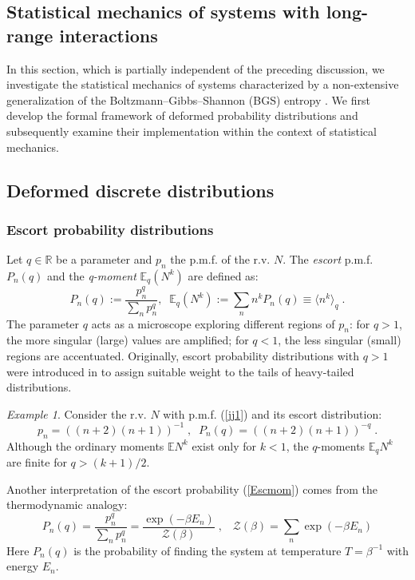 \documentclass[a4paper,12pt]{amsart}
\newcommand{\E}{\mathbb{E}}
\theoremstyle{definition}
\theoremstyle{remark}
\newtheorem{Example}{Example}[section]
\begin{document}
\subsection{Statistical mechanics of systems with long-range interactions }
In this section, which is partially independent of the preceding discussion, we investigate the statistical mechanics of systems characterized by a non-extensive generalization of the Boltzmann–Gibbs–Shannon (BGS) entropy \cite{Tsallis:1987eu}. 
We first develop the formal framework of deformed probability distributions and subsequently examine their implementation within the context of statistical mechanics.
\subsection{Deformed discrete distributions} \label{Escd}
\subsubsection{Escort probability distributions}

Let $q\in \mathbb{R}$ be a parameter and $p_n$ the p.m.f. of the r.v. $N$. The {\it escort} p.m.f. $P_n(q)$ and the {\it q-moment} $\E_q(N^k)$  are defined as:
\begin{equation}\label{Escmom}
  P_n(q):=\frac{p_n^q}{\sum_n p_n^q},\;\; \E_q(N^k):=\sum_n n^k P_n(q)\equiv \langle n^k \rangle _q\;.
\end{equation}
The parameter $q$ acts as a microscope exploring different regions of $p_n$: for $q > 1$, the more singular (large) values are amplified; for $q < 1$, the less singular (small) regions are accentuated. Originally, escort probability distributions with $q>1$ were introduced in \cite{Beck1993} to assign suitable weight to the tails of heavy-tailed distributions. 
\begin{Example}
    Consider the r.v. $N$ with p.m.f. (\ref{jj1}) and its escort distribution:
    \[
    p_n=((n+2)(n+1))^{-1}\;,\;\;P_n(q)=((n+2)(n+1))^{-q}\;.
    \]
    Although the ordinary moments $\E N^k $ exist only for $k<1$, the $q$-moments $\E_q N^k$  are finite for $q>(k+1)/2$. 
    
\end{Example}
Another interpretation of the escort probability (\ref{Escmom}) comes from the thermodynamic analogy:  \begin{equation}\label{analogy}
 P_n(q)=  \frac{p_n^q}{\sum_n p_n^q}= \frac{\exp(-\beta E_n)}{\mathcal{Z}(\beta)}\;, \;\;\; \mathcal{Z}(\beta)=\sum_n \exp(-\beta E_n)
\end{equation}
Here $P_n(q)$ is the probability of finding the system at temperature $T=\beta^{-1}$ with energy $E_n$.
\end{document}
